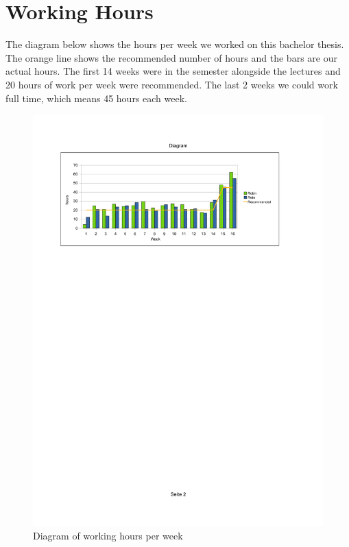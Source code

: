 \documentclass[12pt,halfparskip,DIV11,BCOR10mm]{scrreprt}
\begin{document}
\section{Working Hours}

The diagram below shows the hours per week we worked on this bachelor thesis. The orange line shows the recommended number of hours and the bars are our actual hours. The first 14 weeks were in the semester alongside the lectures and 20 hours of work per week were recommended. The last 2 weeks we could work full time, which means 45 hours each week.

\begin{figure}[H]
 \centering
 \includegraphics[width=\textwidth, trim=50 570 90 70, clip=true]{project/working_hours}
 \caption{Diagram of working hours per week}
 \label{fig:working_hours}
\end{figure}
\end{document}

